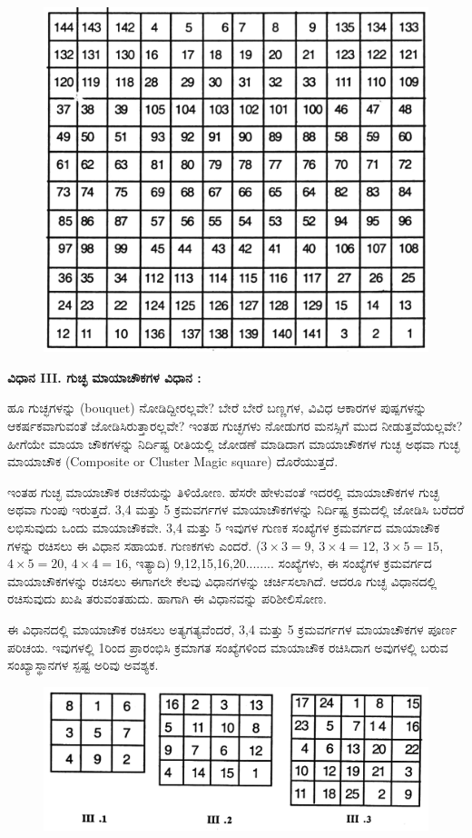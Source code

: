 \begin{figure}[h]
\includegraphics{src/figures/chap3/fig3.29.jpg}
\end{figure}

\textbf{ವಿಧಾನ III. ಗುಚ್ಛ ಮಾಯಾಚೌಕಗಳ ವಿಧಾನ :}

ಹೂ ಗುಚ್ಛಗಳನ್ನು (bouquet) ನೋಡಿದ್ದೀರಲ್ಲವೇ? ಬೇರೆ ಬೇರೆ ಬಣ್ಣಗಳ, ವಿವಿಧ ಆಕಾರಗಳ ಪುಷ್ಪಗಳನ್ನು ಆಕರ್ಷಕವಾಗುವಂತೆ ಜೋಡಿಸಿರುತ್ತಾರಲ್ಲವೇ? ಇಂತಹ ಗುಚ್ಛಗಳು ನೋಡುಗರ ಮನಸ್ಸಿಗೆ ಮುದ ನೀಡುತ್ತವೆಯಲ್ಲವೇ? ಹೀಗೆಯೇ ಮಾಯಾ ಚೌಕಗಳನ್ನು ನಿರ್ದಿಷ್ಟ ರೀತಿಯಲ್ಲಿ ಜೋಡಣೆ ಮಾಡಿದಾಗ ಮಾಯಾಚೌಕಗಳ ಗುಚ್ಛ ಅಥವಾ ಗುಚ್ಛ ಮಾಯಾಚೌಕ (Composite or Cluster Magic square) ದೊರೆಯುತ್ತದೆ.

ಇಂತಹ ಗುಚ್ಛ ಮಾಯಾಚೌಕ ರಚನೆಯನ್ನು ತಿಳಿಯೋಣ. ಹೆಸರೇ ಹೇಳುವಂತೆ ಇದರಲ್ಲಿ ಮಾಯಾಚೌಕಗಳ ಗುಚ್ಛ ಅಥವಾ ಗುಂಪು ಇರುತ್ತದೆ. 3,4 ಮತ್ತು 5 ಕ್ರಮವರ್ಗಗಳ ಮಾಯಾಚೌಕಗಳನ್ನು ನಿರ್ದಿಷ್ಟ ಕ್ರಮದಲ್ಲಿ ಜೋಡಿಸಿ ಬರೆದರೆ ಲಭಿಸುವುದು ಒಂದು ಮಾಯಾಚೌಕವೇ. 3,4 ಮತ್ತು 5 ಇವುಗಳ ಗುಣಕ ಸಂಖ್ಯೆಗಳ ಕ್ರಮವರ್ಗದ ಮಾಯಾಚೌಕ ಗಳನ್ನು ರಚಿಸಲು ಈ ವಿಧಾನ ಸಹಾಯಕ. ಗುಣಕಗಳು ಎಂದರೆ. ($3 \times 3=9$, $3 \times 4=12$, $3 \times 5=15$, $4 \times 5= 20$, $4 \times 4=16$, ಇತ್ಯಾದಿ) 9,12,15,16,20........ ಸಂಖ್ಯೆಗಳು, ಈ ಸಂಖ್ಯೆಗಳ ಕ್ರಮವರ್ಗದ ಮಾಯಾಚೌಕಗಳನ್ನು ರಚಿಸಲು ಈಗಾಗಲೇ ಕೆಲವು ವಿಧಾನಗಳನ್ನು ಚರ್ಚಿಸಲಾಗಿದೆ. ಆದರೂ ಗುಚ್ಛ ವಿಧಾನದಲ್ಲಿ ರಚಿಸುವುದು ಖುಷಿ ತರುವಂತಹುದು. ಹಾಗಾಗಿ ಈ ವಿಧಾನವನ್ನು ಪರಿಶೀಲಿಸೋಣ.

ಈ ವಿಧಾನದಲ್ಲಿ ಮಾಯಾಚೌಕ ರಚಿಸಲು ಅತ್ಯಗತ್ಯವೆಂದರೆ, 3,4 ಮತ್ತು 5 ಕ್ರಮವರ್ಗಗಳ ಮಾಯಾಚೌಕಗಳ ಪೂರ್ಣ ಪರಿಚಯ. ಇವುಗಳಲ್ಲಿ 1ರಿಂದ ಪ್ರಾರಂಭಿಸಿ ಕ್ರಮಾಗತ ಸಂಖ್ಯೆಗಳಿಂದ ಮಾಯಾಚೌಕ ರಚಿಸಿದಾಗ ಅವುಗಳಲ್ಲಿ ಬರುವ ಸಂಖ್ಯಾಸ್ಥಾನಗಳ ಸ್ಪಷ್ಟ ಅರಿವು ಅವಶ್ಯಕ.
\begin{figure}[h]
\includegraphics{src/figures/chap3/fig3.30.jpg}
\end{figure}

